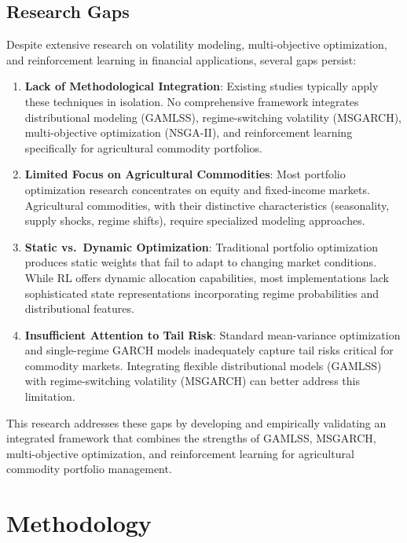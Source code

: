 \documentclass[
  10pt,
  a4paper,
]{article}
\begin{document}
\subsection{Research Gaps}\label{sec-lit-gaps}

Despite extensive research on volatility modeling, multi-objective
optimization, and reinforcement learning in financial applications,
several gaps persist:

\begin{enumerate}
\def\labelenumi{\arabic{enumi}.}
\item
  \textbf{Lack of Methodological Integration}: Existing studies
  typically apply these techniques in isolation. No comprehensive
  framework integrates distributional modeling (GAMLSS),
  regime-switching volatility (MSGARCH), multi-objective optimization
  (NSGA-II), and reinforcement learning specifically for agricultural
  commodity portfolios.
\item
  \textbf{Limited Focus on Agricultural Commodities}: Most portfolio
  optimization research concentrates on equity and fixed-income markets.
  Agricultural commodities, with their distinctive characteristics
  (seasonality, supply shocks, regime shifts), require specialized
  modeling approaches.
\item
  \textbf{Static vs.~Dynamic Optimization}: Traditional portfolio
  optimization produces static weights that fail to adapt to changing
  market conditions. While RL offers dynamic allocation capabilities,
  most implementations lack sophisticated state representations
  incorporating regime probabilities and distributional features.
\item
  \textbf{Insufficient Attention to Tail Risk}: Standard mean-variance
  optimization and single-regime GARCH models inadequately capture tail
  risks critical for commodity markets. Integrating flexible
  distributional models (GAMLSS) with regime-switching volatility
  (MSGARCH) can better address this limitation.
\end{enumerate}

This research addresses these gaps by developing and empirically
validating an integrated framework that combines the strengths of
GAMLSS, MSGARCH, multi-objective optimization, and reinforcement
learning for agricultural commodity portfolio management.

\section{Methodology}\label{sec-methodology}
\end{document}
